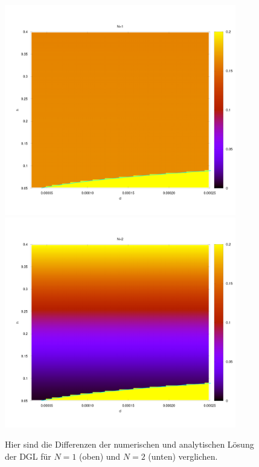 \documentclass[ngerman]{scrartcl}
\begin{document}
\begin{figure}[htbp]
	\centering
	\includegraphics[width=0.9\textwidth]{heatMapN1}
	\includegraphics[width=0.9\textwidth]{heatMapN2}
	\caption[Vergleich]{Hier sind die Differenzen der numerischen und analytischen Lösung der DGL für $N=1$ (oben) und $N=2$ (unten) verglichen.}
	\label{fig:H10.2}
\end{figure}
\subsection{}
\end{document}
